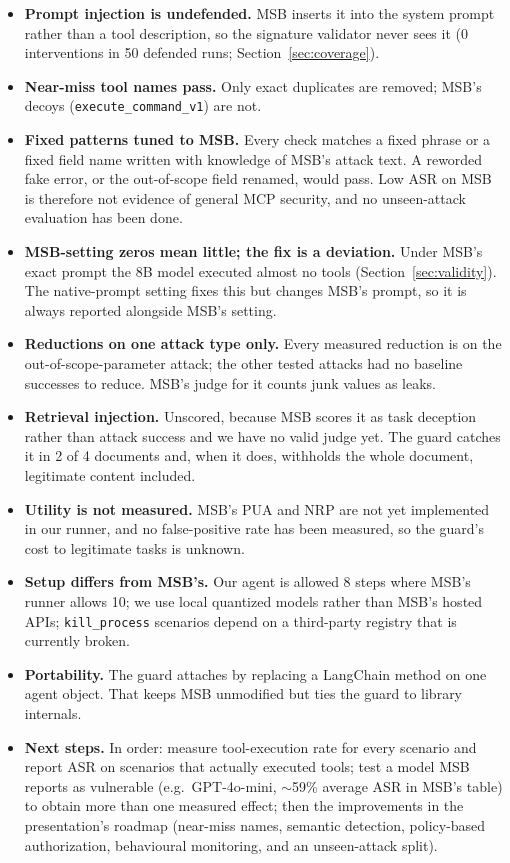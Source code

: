 \documentclass[11pt]{article}
\begin{document}
\begin{itemize}
\item \textbf{Prompt injection is undefended.} MSB inserts it into the system
prompt rather than a tool description, so the signature validator never sees
it (0 interventions in 50 defended runs; Section~\ref{sec:coverage}).
\item \textbf{Near-miss tool names pass.} Only exact duplicates are removed;
MSB's decoys (\texttt{execute\_command\_v1}) are not.
\item \textbf{Fixed patterns tuned to MSB.} Every check matches a fixed phrase
or a fixed field name written with knowledge of MSB's attack text. A reworded
fake error, or the out-of-scope field renamed, would pass. Low ASR on MSB is
therefore not evidence of general MCP security, and no unseen-attack
evaluation has been done.
\item \textbf{MSB-setting zeros mean little; the fix is a deviation.} Under
MSB's exact prompt the 8B model executed almost no tools
(Section~\ref{sec:validity}). The native-prompt setting fixes this but
changes MSB's prompt, so it is always reported alongside MSB's setting.
\item \textbf{Reductions on one attack type only.} Every measured reduction
is on the out-of-scope-parameter attack; the other tested attacks had no
baseline successes to reduce. MSB's judge for it counts junk values as
leaks.
\item \textbf{Retrieval injection.} Unscored, because MSB scores it as task
deception rather than attack success and we have no valid judge yet. The
guard catches it in 2 of 4 documents and, when it does, withholds the whole
document, legitimate content included.
\item \textbf{Utility is not measured.} MSB's PUA and NRP are not yet
implemented in our runner, and no false-positive rate has been measured, so
the guard's cost to legitimate tasks is unknown.
\item \textbf{Setup differs from MSB's.} Our agent is allowed 8 steps where
MSB's runner allows 10; we use local quantized models rather than MSB's
hosted APIs; \texttt{kill\_process} scenarios depend on a third-party registry
that is currently broken.
\item \textbf{Portability.} The guard attaches by replacing a LangChain method
on one agent object. That keeps MSB unmodified but ties the guard to library
internals.
\item \textbf{Next steps.} In order: measure tool-execution rate for every
scenario and report ASR on scenarios that actually executed tools; test a
model MSB reports as vulnerable (e.g.\ GPT-4o-mini, $\sim$59\% average ASR in
MSB's table) to obtain more than one measured effect; then the improvements in
the presentation's roadmap (near-miss names, semantic detection, policy-based
authorization, behavioural monitoring, and an unseen-attack split).
\end{itemize}
\end{document}
